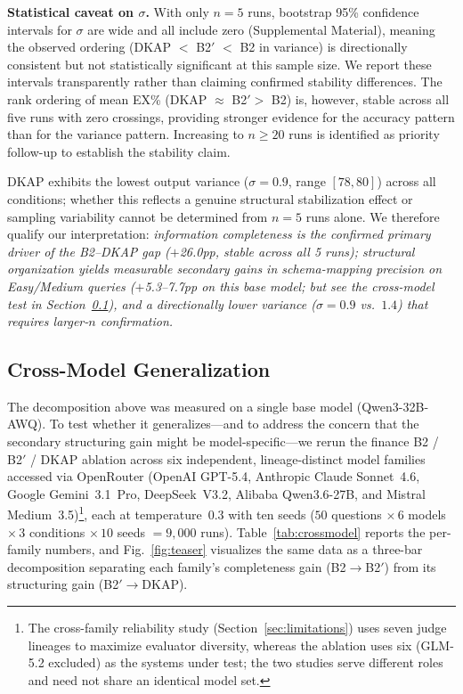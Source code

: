 \documentclass[fleqn,10pt,lineno]{wlpeerj}
\begin{document}
\textbf{Statistical caveat on $\sigma$.} With only $n=5$ runs, bootstrap 95\% confidence intervals for $\sigma$ are wide and all include zero (Supplemental Material), meaning the observed ordering (DKAP $<$ B2$'$ $<$ B2 in variance) is directionally consistent but not statistically significant at this sample size. We report these intervals transparently rather than claiming confirmed stability differences. The rank ordering of mean EX\% (DKAP $\approx$ B2$' >$ B2) is, however, stable across all five runs with zero crossings, providing stronger evidence for the accuracy pattern than for the variance pattern. Increasing to $n \geq 20$ runs is identified as priority follow-up to establish the stability claim.

DKAP exhibits the lowest output variance ($\sigma = 0.9$, range $[78,80]$) across all conditions; whether this reflects a genuine structural stabilization effect or sampling variability cannot be determined from $n=5$ runs alone. We therefore qualify our interpretation: \textit{information completeness is the confirmed primary driver of the B2--DKAP gap ($+$26.0pp, stable across all 5 runs); structural organization yields measurable secondary gains in schema-mapping precision on Easy/Medium queries ($+$5.3--7.7pp on this base model; but see the cross-model test in Section~\ref{sec:crossmodel}), and a directionally lower variance ($\sigma=0.9$ vs.\ $1.4$) that requires larger-$n$ confirmation.}

\subsection{Cross-Model Generalization}
\label{sec:crossmodel}

The decomposition above was measured on a single base model (Qwen3-32B-AWQ). To test whether it generalizes---and to address the concern that the secondary structuring gain might be model-specific---we rerun the finance B2 / B2$'$ / DKAP ablation across six independent, lineage-distinct model families accessed via OpenRouter (OpenAI GPT-5.4, Anthropic Claude Sonnet~4.6, Google Gemini~3.1~Pro, DeepSeek~V3.2, Alibaba Qwen3.6-27B, and Mistral Medium~3.5)\footnote{The cross-family reliability study (Section~\ref{sec:limitations}) uses seven judge lineages to maximize evaluator diversity, whereas the ablation uses six (GLM-5.2 excluded) as the systems under test; the two studies serve different roles and need not share an identical model set.}, each at temperature~$0.3$ with ten seeds ($50$ questions $\times\,6$ models $\times\,3$ conditions $\times\,10$ seeds $=9{,}000$ runs). Table~\ref{tab:crossmodel} reports the per-family numbers, and Fig.~\ref{fig:teaser} visualizes the same data as a three-bar decomposition separating each family's completeness gain (B2$\rightarrow$B2$'$) from its structuring gain (B2$'\rightarrow$DKAP).
\end{document}
